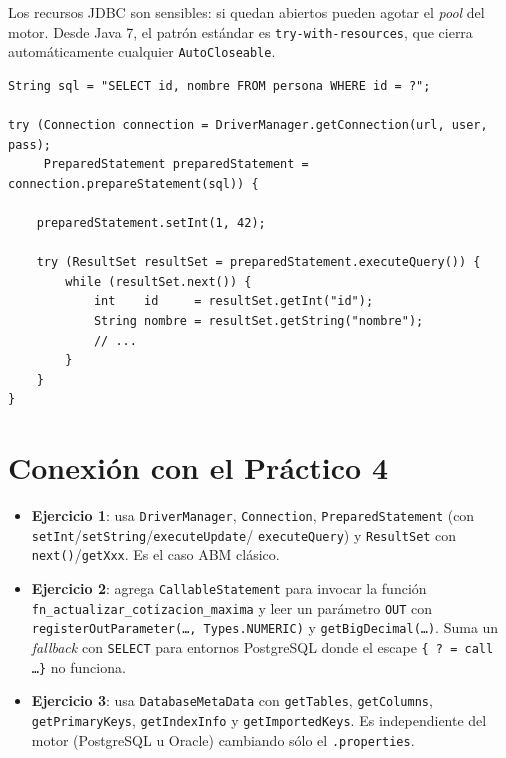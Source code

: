 \documentclass[11pt,a4paper]{article}
\begin{document}
Los recursos JDBC son sensibles: si quedan abiertos pueden agotar el
\emph{pool} del motor. Desde Java 7, el patrón estándar es
\texttt{try-with-resources}, que cierra automáticamente cualquier
\texttt{AutoCloseable}.

\begin{lstlisting}
String sql = "SELECT id, nombre FROM persona WHERE id = ?";

try (Connection connection = DriverManager.getConnection(url, user, pass);
     PreparedStatement preparedStatement = connection.prepareStatement(sql)) {

    preparedStatement.setInt(1, 42);

    try (ResultSet resultSet = preparedStatement.executeQuery()) {
        while (resultSet.next()) {
            int    id     = resultSet.getInt("id");
            String nombre = resultSet.getString("nombre");
            // ...
        }
    }
}
\end{lstlisting}

\section{Conexión con el Práctico 4}

\begin{itemize}
    \item \textbf{Ejercicio 1}: usa \texttt{DriverManager},
    \texttt{Connection}, \texttt{PreparedStatement} (con
    \texttt{setInt}/\texttt{setString}/\texttt{executeUpdate}/
    \texttt{executeQuery}) y \texttt{ResultSet} con
    \texttt{next()}/\texttt{getXxx}. Es el caso ABM clásico.
    \item \textbf{Ejercicio 2}: agrega \texttt{CallableStatement} para
    invocar la función \texttt{fn\_actualizar\_cotizacion\_maxima} y
    leer un parámetro \texttt{OUT} con
    \texttt{registerOutParameter(\dots, Types.NUMERIC)} y
    \texttt{getBigDecimal(\dots)}. Suma un \emph{fallback} con
    \texttt{SELECT} para entornos PostgreSQL donde el escape
    \texttt{\{ ? = call \dots \}} no funciona.
    \item \textbf{Ejercicio 3}: usa \texttt{DatabaseMetaData} con
    \texttt{getTables}, \texttt{getColumns}, \texttt{getPrimaryKeys},
    \texttt{getIndexInfo} y \texttt{getImportedKeys}. Es
    independiente del motor (PostgreSQL u Oracle) cambiando sólo el
    \texttt{.properties}.
\end{itemize}
\end{document}
